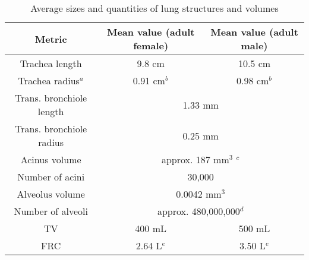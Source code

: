
\begin{table}[ht]
    \caption{Average sizes and quantities of lung structures and volumes}
    \label{tab:lung-sizes}
    \centering
    \renewcommand{\arraystretch}{1.3}
    \begin{tabular}{ |c|c|c| }
    \hline
        Metric & Mean value (adult female) & Mean value (adult male) \\
        \hline \hline
        Trachea length & 9.8 cm \cite{KamelEtAl2009} & 10.5 cm \cite{KamelEtAl2009} \\
        Trachea radius$^a$ & 0.91 cm$^b$ \cite{Hoffstein1986} & 0.98 cm$^b$ \cite{Hoffstein1986} \\
        \hline
        Trans. bronchiole length & \multicolumn{2}{|c|}{ 1.33 mm \cite{HaefeliBleuerWeibel1988} } \\
        Trans. bronchiole radius & \multicolumn{2}{|c|}{ 0.25 mm \cite{HaefeliBleuerWeibel1988} } \\
        Acinus volume     & \multicolumn{2}{|c|}{ approx. 187 mm$^3$ $^c$ \cite{HaefeliBleuerWeibel1988} } \\
        Number of acini   & \multicolumn{2}{|c|}{ 30,000 \cite{WeibelEtAl2005} } \\
        Alveolus volume   & \multicolumn{2}{|c|}{ 0.0042 mm$^3$ \cite{OchsEtAl2004} } \\
        Number of alveoli & \multicolumn{2}{|c|}{ approx. 480,000,000$^d$ \cite{OchsEtAl2004} } \\
        \hline
        TV & 400 mL \cite{StatpearlsTidalVolume} & 500 mL \cite{StatpearlsTidalVolume} \\
        FRC & 2.64 L$^e$ & 3.50 L$^e$ \\
        \hline
    \end{tabular}
    \newline

\end{table}
